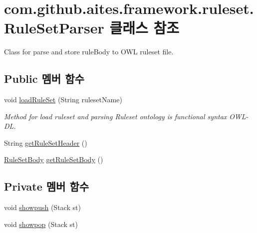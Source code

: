 \hypertarget{classcom_1_1github_1_1aites_1_1framework_1_1ruleset_1_1_rule_set_parser}{}\section{com.\+github.\+aites.\+framework.\+ruleset.\+Rule\+Set\+Parser 클래스 참조}
\label{classcom_1_1github_1_1aites_1_1framework_1_1ruleset_1_1_rule_set_parser}


Class for parse and store rule\+Body to O\+WL ruleset file.  


\subsection*{Public 멤버 함수}
\begin{DoxyCompactItemize}
\item 
void \mbox{\hyperlink{classcom_1_1github_1_1aites_1_1framework_1_1ruleset_1_1_rule_set_parser_ae85e70ba4e18d5d98a4dd9a8bdb01b0b}{load\+Rule\+Set}} (String ruleset\+Name)
\begin{DoxyCompactList}\small\item\em Method for load ruleset and parsing Ruleset ontology is functional syntax O\+W\+L-\/\+DL. \end{DoxyCompactList}\item 
String \mbox{\hyperlink{classcom_1_1github_1_1aites_1_1framework_1_1ruleset_1_1_rule_set_parser_a0ae3dffb9369fb6ff4e1a1f2fdede15f}{get\+Rule\+Set\+Header}} ()
\item 
\mbox{\hyperlink{classcom_1_1github_1_1aites_1_1framework_1_1ruleset_1_1_rule_set_body}{Rule\+Set\+Body}} \mbox{\hyperlink{classcom_1_1github_1_1aites_1_1framework_1_1ruleset_1_1_rule_set_parser_a27e7145cb2cea6ccbd8996b907c6db0a}{get\+Rule\+Set\+Body}} ()
\end{DoxyCompactItemize}
\subsection*{Private 멤버 함수}
\begin{DoxyCompactItemize}
\item 
void \mbox{\hyperlink{classcom_1_1github_1_1aites_1_1framework_1_1ruleset_1_1_rule_set_parser_a81d054f35b4d13482daa2de19fc8a4c6}{showpush}} (Stack st)
\item 
void \mbox{\hyperlink{classcom_1_1github_1_1aites_1_1framework_1_1ruleset_1_1_rule_set_parser_af965729964803bdb5e9b2240fea46f44}{showpop}} (Stack st)
\end{DoxyCompactItemize}
